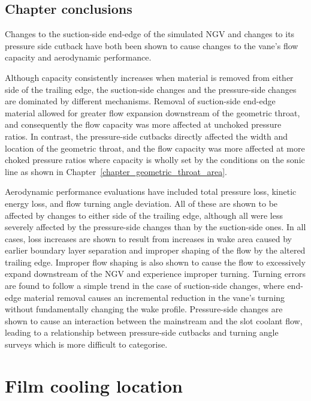 \documentclass[a4paper, 11pt, oneside]{report}
\begin{document}
\section{Chapter conclusions}

Changes to the suction-side end-edge of the simulated NGV and changes to its pressure side cutback have both been shown to cause changes to the vane's flow capacity and aerodynamic performance. 

Although capacity consistently increases when material is removed from either side of the trailing edge, the suction-side changes and the pressure-side changes are dominated by different mechanisms. Removal of suction-side end-edge material allowed for greater flow expansion downstream of the geometric throat, and consequently the flow capacity was more affected at unchoked pressure ratios. In contrast, the pressure-side cutbacks directly affected the width and location of the geometric throat, and the flow capacity was more affected at more choked pressure ratios where capacity is wholly set by the conditions on the sonic line as shown in Chapter~\ref{chapter_geometric_throat_area}.

Aerodynamic performance evaluations have included total pressure loss, kinetic energy loss, and flow turning angle deviation. All of these are shown to be affected by changes to either side of the trailing edge, although all were less severely affected by the pressure-side changes than by the suction-side ones. In all cases, loss increases are shown to result from increases in wake area caused by earlier boundary layer separation and improper shaping of the flow by the altered trailing edge. Improper flow shaping is also shown to cause the flow to excessively expand downstream of the NGV and experience improper turning. Turning errors are found to follow a simple trend in the case of suction-side changes, where end-edge material removal causes an incremental reduction in the vane's turning without fundamentally changing the wake profile. Pressure-side changes are shown to cause an interaction between the mainstream and the slot coolant flow, leading to a relationship between pressure-side cutbacks and turning angle surveys which is more difficult to categorise.



\chapter{Film cooling location}
\label{chapter_leading_edge}
\end{document}
